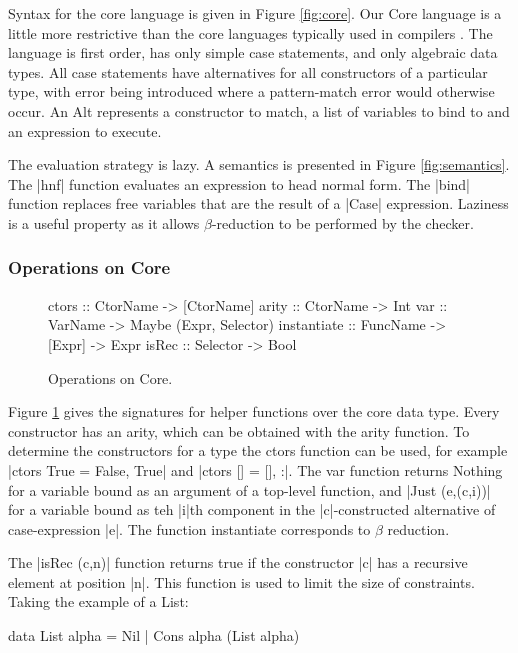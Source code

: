 \documentclass[preprint]{sigplanconf}
\newcommand{\C}[1]{\textsf{#1}}
\begin{document}
Syntax for the core language is given in Figure \ref{fig:core}. Our Core language is a little more restrictive than the core languages typically used in compilers \citep{ghc_core}. The language is first order, has only simple case statements, and only algebraic data types. All case statements have alternatives for all constructors of a particular type, with error being introduced where a pattern-match error would otherwise occur. An \C{Alt} represents a constructor to match, a list of variables to bind to and an expression to execute.

The evaluation strategy is lazy. A semantics is presented in Figure \ref{fig:semantics}. The |hnf| function evaluates an expression to head normal form. The |bind| function replaces free variables that are the result of a |Case| expression. Laziness is a useful property as it allows $\beta$-reduction to be performed by the checker.

\subsubsection{Operations on Core}

\begin{figure}
\begin{code}
ctors        :: CtorName  -> [CtorName]
arity        :: CtorName  -> Int
var          :: VarName   -> Maybe (Expr, Selector)
instantiate  :: FuncName  -> [Expr] -> Expr
isRec        :: Selector  -> Bool
\end{code}
\caption{Operations on Core.}
\label{fig:core_operations}
\end{figure}

Figure \ref{fig:core_operations} gives the signatures for helper functions over the core data type. Every constructor has an arity, which can be obtained with the \C{arity} function. To determine the constructors for a type the \C{ctors} function can be used, for example |ctors True = {False, True}| and |ctors [] = {[], :}|. The \C{var} function returns \C{Nothing} for a variable bound as an argument of a top-level function, and |Just (e,(c,i))| for a variable bound as teh |i|th component in the |c|-constructed alternative of case-expression |e|. The function \C{instantiate} corresponds to $\beta$ reduction.

The |isRec (c,n)| function returns true if the constructor |c| has a recursive element at position |n|. This function is used to limit the size of constraints. Taking the example of a \C{List}:

\begin{code}
data List alpha = Nil | Cons alpha (List alpha)
\end{code}
\end{document}
